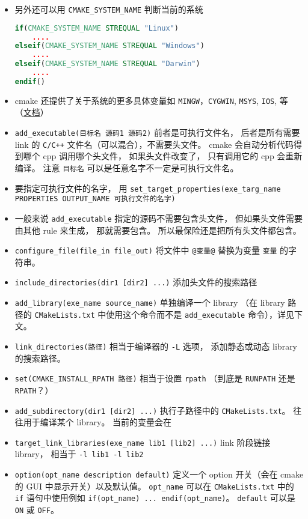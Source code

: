 \begin{itemize}
\begin{lstlisting}[language=cmake]
\end{lstlisting}
\item 另外还可以用 \verb`CMAKE_SYSTEM_NAME` 判断当前的系统
\begin{lstlisting}[language=cmake]
if(CMAKE_SYSTEM_NAME STREQUAL "Linux")
    ....
elseif(CMAKE_SYSTEM_NAME STREQUAL "Windows")
    ....
elseif(CMAKE_SYSTEM_NAME STREQUAL "Darwin")
    ....
endif()
\end{lstlisting}
\item cmake 还提供了关于系统的更多具体变量如 \verb`MINGW`，\verb`CYGWIN`, \verb`MSYS`, \verb`IOS`, 等（\href{https://cmake.org/cmake/help/latest/manual/cmake-variables.7.html}{文档}）
\item \verb`add_executable(目标名 源码1 源码2)` 前者是可执行文件名， 后者是所有需要 link 的 \verb`C/C++` 文件名（可以混合），不需要头文件。 cmake 会自动分析代码得到哪个 cpp 调用哪个头文件， 如果头文件改变了， 只有调用它的 cpp 会重新编译。 注意 \verb`目标名` 可以是任意名字不一定是可执行文件名。
\item 要指定可执行文件的名字， 用 \verb`set_target_properties(exe_targ_name PROPERTIES OUTPUT_NAME 可执行文件的名字)`
\item 一般来说 \verb`add_executable` 指定的源码不需要包含头文件， 但如果头文件需要由其他 rule 来生成， 那就需要包含。 所以最保险还是把所有头文件都包含。
\item \verb`configure_file(file_in file_out)` 将文件中 \verb`@变量@` 替换为变量 \verb`变量` 的字符串。
\item \verb`include_directories(dir1 [dir2] ...)` 添加头文件的搜索路径
\item \verb`add_library(exe_name source_name)` 单独编译一个 library （在 library 路径的 \verb`CMakeLists.txt` 中使用这个命令而不是 \verb`add_executable` 命令），详见下文。
\item \verb`link_directories(路径)` 相当于编译器的 \verb`-L` 选项， 添加静态或动态 library 的搜索路径。
\item \verb`set(CMAKE_INSTALL_RPATH 路径)` 相当于设置 \verb`rpath` （到底是 \verb`RUNPATH` 还是 \verb`RPATH`？）
\item \verb`add_subdirectory(dir1 [dir2] ...)` 执行子路径中的 \verb`CMakeLists.txt`。 往往用于编译某个 library。 当前的变量会在 
\item \verb`target_link_libraries(exe_name lib1 [lib2] ...)` link 阶段链接 library， 相当于 \verb`-l lib1 -l lib2`
\item \verb`option(opt_name description default)` 定义一个 option 开关（会在 cmake 的 GUI 中显示开关）以及默认值。 \verb`opt_name` 可以在 \verb`CMakeLists.txt` 中的 \verb`if` 语句中使用例如 \verb`if(opt_name) ... endif(opt_name)`。 \verb`default` 可以是 \verb`ON` 或 \verb`OFF`。

\end{itemize}

